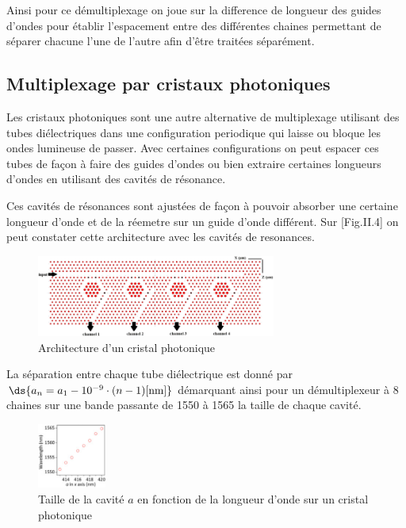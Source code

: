 \documentclass[oneside]{book}
\begin{document}
			Ainsi pour ce démultiplexage on joue sur la difference de longueur des guides d'ondes pour établir l'espacement entre des différentes chaines permettant de séparer chacune l'une de l'autre afin d'être traitées séparément.

			 

			\subsection{Multiplexage par cristaux photoniques}

			Les cristaux photoniques sont une autre alternative de multiplexage utilisant des tubes diélectriques dans une configuration periodique qui laisse ou bloque les ondes lumineuse de passer. Avec certaines configurations on peut espacer ces tubes de façon à faire des guides d'ondes ou bien extraire certaines longueurs d'ondes en utilisant des cavités de résonance. 

			Ces cavités de résonances sont ajustées de façon à pouvoir absorber une certaine longueur d'onde\cite{PhC} et de la réemetre sur un guide d'onde différent. Sur [Fig.II.4] on peut constater cette architecture avec les cavités de resonances. 

			\begin{figure}[ht!]
				\centering
				\includegraphics[width=0.7\textwidth]{./object/rescav.png}
				\caption{Architecture d'un cristal photonique}
				\label{fig:rescav}
			\end{figure}
			
			La séparation entre chaque tube diélectrique est donné par $\ds{a_n=a_1- 10^{-9}\cdot(n-1)\text{[nm]} }$ démarquant ainsi pour un démultiplexeur à 8 chaines sur une bande passante de 1550 à 1565 la taille de chaque cavité\cite{PhClen}. 
			\begin{figure}[ht!]
				\centering
				\includegraphics[width=0.2\textwidth]{./object/phclen.png}
				\caption{Taille de la cavité $a$ en fonction de la longueur d'onde sur un cristal photonique}
			\end{figure}
\end{document}
